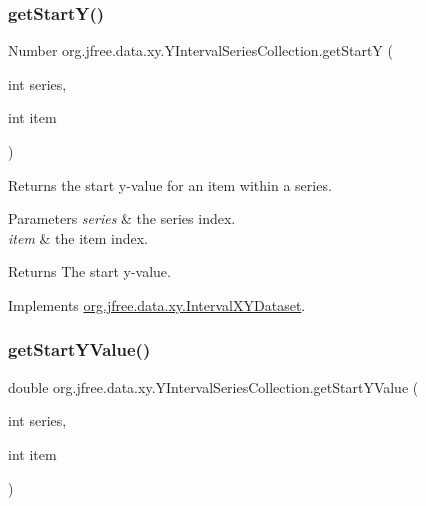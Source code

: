 \mbox{\label{classorg_1_1jfree_1_1data_1_1xy_1_1_y_interval_series_collection_af499ea43862281841b964053bc9950dc}} 
\subsubsection{\texorpdfstring{get\+Start\+Y()}{getStartY()}}
{\footnotesize\ttfamily Number org.\+jfree.\+data.\+xy.\+Y\+Interval\+Series\+Collection.\+get\+StartY (\begin{DoxyParamCaption}\item[{int}]{series,  }\item[{int}]{item }\end{DoxyParamCaption})}

Returns the start y-\/value for an item within a series.


\begin{DoxyParams}{Parameters}
{\em series} & the series index. \\
\hline
{\em item} & the item index.\\
\hline
\end{DoxyParams}
\begin{DoxyReturn}{Returns}
The start y-\/value. 
\end{DoxyReturn}


Implements \mbox{\hyperlink{interfaceorg_1_1jfree_1_1data_1_1xy_1_1_interval_x_y_dataset_afdd414735adb233734bc35b76a005ed9}{org.\+jfree.\+data.\+xy.\+Interval\+X\+Y\+Dataset}}.

\mbox{\label{classorg_1_1jfree_1_1data_1_1xy_1_1_y_interval_series_collection_a3f029817a3f87b12926083b76d0ce5e0}} 
\subsubsection{\texorpdfstring{get\+Start\+Y\+Value()}{getStartYValue()}}
{\footnotesize\ttfamily double org.\+jfree.\+data.\+xy.\+Y\+Interval\+Series\+Collection.\+get\+Start\+Y\+Value (\begin{DoxyParamCaption}\item[{int}]{series,  }\item[{int}]{item }\end{DoxyParamCaption})}

